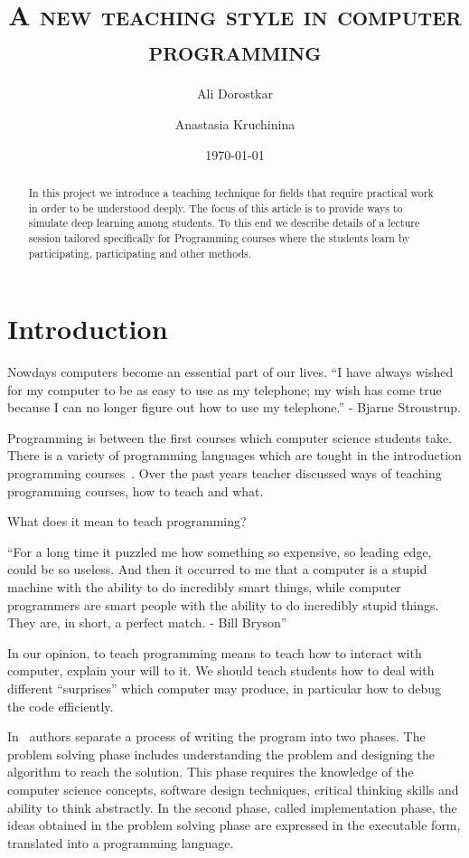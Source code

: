 \documentclass{article}
\author{Ali Dorostkar \and Anastasia Kruchinina}
\title{\textsc{A new teaching style in computer programming}}
\date{\today}
\begin{document}
\maketitle \begin{abstract}
In this project we introduce a teaching technique for fields that require
practical work in order to be understood deeply. The focus of this article is 
to provide ways to simulate deep learning among students. To this end we describe 
details of a lecture session tailored specifically for Programming courses
where the students learn by participating, participating and other methods.
\end{abstract}

\section{Introduction} %
\label{sec:introduction}

Nowdays computers become an essential part of our lives.  ``I have
always wished for my computer to be as easy to use as my telephone; my
wish has come true because I can no longer figure out how to use my
telephone.'' - Bjarne Stroustrup.  

Programming is between the first courses which computer science
students take. There is a variety of programming languages which are
tought in the introduction programming
courses~\cite{de2002language}. Over the past years teacher discussed
ways of teaching programming courses, how to teach and what.

What does it mean to teach programming?

``For a long time it puzzled me how something so expensive, so leading edge,
could be so useless. And then it occurred to me that a computer is a stupid
machine with the ability to do incredibly smart things, while computer
programmers are smart people with the ability to do incredibly stupid things.
They are, in short, a perfect match. - Bill Bryson''

In our opinion, to teach programming means to teach how to interact
with computer, explain your will to it. We should teach students how
to deal with different ``surprises'' which computer may produce, in
particular how to debug the code efficiently.

In~\cite{state_of_art} authors separate a process of writing the
program into two phases. The problem solving phase includes
understanding the problem and designing the algorithm to reach the
solution. This phase requires the knowledge of the computer science
concepts, software design techniques, critical thinking skills and
ability to think abstractly.  In the second phase, called
implementation phase, the ideas obtained in the problem solving phase
are expressed in the executable form, translated into a programming
language.
\end{document}
